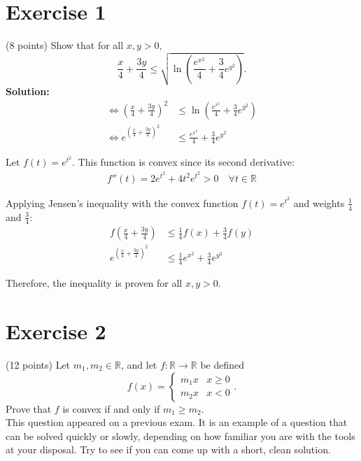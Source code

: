 \documentclass{article}
\begin{document}
\section*{Exercise 1}
(8 points) Show that for all $x, y > 0$,
\[
\frac{x}{4} + \frac{3y}{4} \leq \sqrt{\ln \left(\frac{e^{x^2}}{4} + \frac{3}{4}e^{y^2}\right)}.
\]
\textbf{Solution:}
\begin{align*}
    \Leftrightarrow \left(\frac{x}{4} + \frac{3y}{4}\right)^2 &\leq \ln \left(\frac{e^{x^2}}{4} + \frac{3}{4}e^{y^2}\right) \\
    \Leftrightarrow e^{\left(\frac{x}{4} + \frac{3y}{4}\right)^2} &\leq \frac{e^{x^2}}{4} + \frac{3}{4}e^{y^2}
\end{align*}

Let $f(t) = e^{t^2}$. This function is convex since its second derivative:
\begin{align*}
f''(t) = 2e^{t^2} + 4t^2e^{t^2} > 0 \quad \forall t \in \mathbb{R}
\end{align*}

Applying Jensen's inequality with the convex function $f(t) = e^{t^2}$ and weights $\frac{1}{4}$ and $\frac{3}{4}$:
\begin{align*}
f\left(\frac{x}{4} + \frac{3y}{4}\right) &\leq \frac{1}{4}f(x) + \frac{3}{4}f(y)\\
e^{\left(\frac{x}{4} + \frac{3y}{4}\right)^2} &\leq \frac{1}{4}e^{x^2} + \frac{3}{4}e^{y^2}
\end{align*}

Therefore, the inequality is proven for all $x, y > 0$.

\newpage

\section*{Exercise 2}
(12 points) Let $m_1, m_2 \in \mathbb{R}$, and let $f : \mathbb{R} \to \mathbb{R}$ be defined
\[
f(x) = 
\begin{cases}
m_1 x & x \geq 0 \\
m_2 x & x < 0
\end{cases}.
\]
Prove that $f$ is convex if and only if $m_1 \geq m_2$. \\

This question appeared on a previous exam. It is an example of a question that can be solved quickly or slowly, depending on how familiar you are with the tools at your disposal. Try to see if you can come up with a short, clean solution. \\
\end{document}

